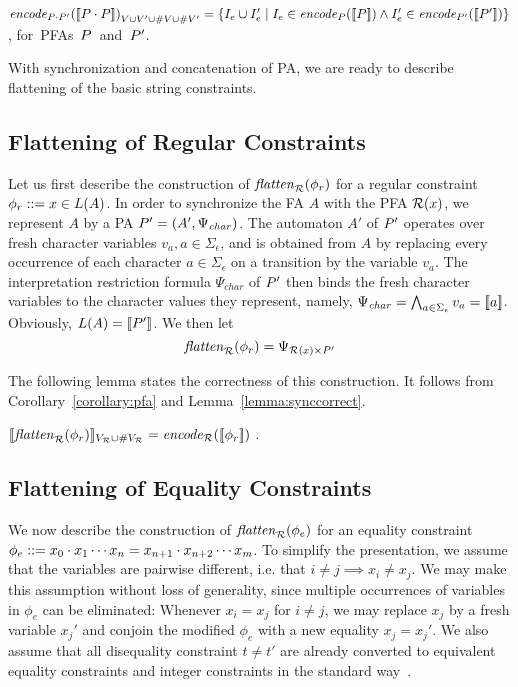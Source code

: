 \documentclass[sigplan,screen]{acmart}
\begin{document}
\begin{lemma}
$\mathit{encode}_{P \cdot P'}{([\![P \cdot P]\!])}_{V\cup V' \cup \#{V}\cup\#{V'}} =
\{I_e \cup I_e'\mid I_e \in \mathit{encode}_{P} ([\![P]\!]) \wedge I_e' \in\mathit{encode}_{P'} ([\![P']\!])\}$, \mbox{for PFAs $P$ and $P'$.}
\end{lemma}

With synchronization and concatenation of PA, we are ready to describe flattening of the basic string constraints.

\subsection{Flattening of Regular Constraints} \label{section:mem}

Let us first describe the construction of $\mathit{flatten}_{\mathcal{R}}(\phi_r)$ for a regular constraint $\phi_r ::= x \in L(A)$. 
In order to synchronize the FA $A$ with the PFA $\mathcal{R}(x)$, 
we represent $A$ by a PA $P' = (A',\Psi_{\mathit{char}})$.
The automaton $A'$ of $P'$ operates over fresh character variables $v_a, a\in\Sigma_\epsilon$, 
and is obtained from $A$ by replacing every occurrence of each character $a\in\Sigma_{\epsilon}$ on a transition by the variable $v_a$. 
The interpretation restriction formula $\Psi_{\mathit{char}}$ of $P'$ then binds the fresh character variables to the character values they represent, 
namely, $\Psi_{\mathit{char}} = \bigwedge_{a\in\Sigma_\epsilon} v_a = [\![a]\!]$. Obviously, $L(A) = [\![P']\!]$. 
We then let 
$$\mathit{flatten}_{\mathcal{R}}(\phi_r) = \Psi_{\mathcal{R}(x) \times P'}$$ 

The following lemma states the correctness of this construction. 
It follows from Corollary~\ref{corollary:pfa} and Lemma~\ref{lemma:synccorrect}. 
\begin{lemma}\label{lemma:memcorrect}  $[\![\mathit{flatten}_{\mathcal{R}}(\phi_r)]\!]_{V_{\mathcal{R}} \cup \#V_{\mathcal{R}}} = \mathit{encode}_{\mathcal{R}} ([\![\phi_r]\!])$ . 
\end{lemma}

\subsection{Flattening of Equality Constraints} \label{section:eq}

We now describe the construction of $\mathit{flatten}_{\mathcal{R}}(\phi_e)$ for an equality constraint $\phi_e::= x_0\cdot x_1 \cdots x_n = x_{n+1}\cdot x_{n+2} \cdots x_m$. 
%
To simplify the presentation, we assume that the variables are pairwise different, i.e. that $i\neq j \implies x_i \neq x_j$. We may make this assumption without loss of generality, since multiple occurrences of variables in $\phi_e$ can be eliminated: Whenever $x_i = x_j$ for $i \neq j$, we may replace $x_j$ by a fresh variable $x_j'$ and conjoin the modified $\phi_e$ with a new equality $x_j = x_j'$. 
%
We also assume that all disequality constraint $t \neq t'$ are already converted to equivalent equality constraints and integer constraints in the standard way~\cite{abdulla2015norn}.
\end{document}
